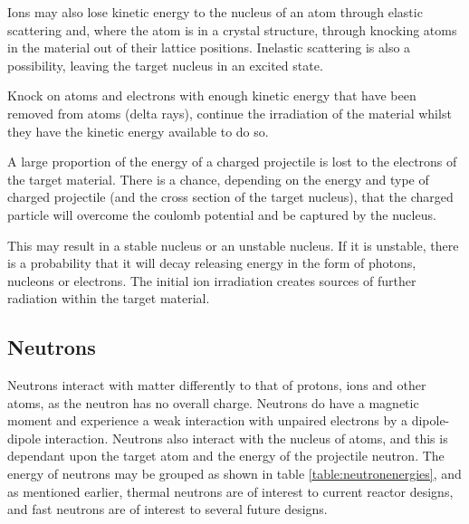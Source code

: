 Ions may also lose kinetic energy to the nucleus of an atom through elastic scattering and, where the atom is in a crystal structure, through knocking atoms in the material out of their lattice positions.  Inelastic scattering is also a possibility, leaving the target nucleus in an excited state.

Knock on atoms and electrons with enough kinetic energy that have been removed from atoms (delta rays), continue the irradiation of the material whilst they have the kinetic energy available to do so.

A large proportion of the energy of a charged projectile is lost to the electrons of the target material.  There is a chance, depending on the energy and type of charged projectile (and the cross section of the target nucleus), that the charged particle will overcome the coulomb potential and be captured by the nucleus.

This may result in a stable nucleus or an unstable nucleus.  If it is unstable, there is a probability that it will decay releasing energy in the form of photons, nucleons or electrons.  The initial ion irradiation creates sources of further radiation within the target material.



\FloatBarrier
\subsection{Neutrons}


Neutrons interact with matter differently to that of protons, ions and other atoms, as the neutron has no overall charge.  Neutrons do have a magnetic moment and experience a weak interaction with unpaired electrons by a dipole-dipole interaction.  Neutrons also interact with the nucleus of atoms, and this is dependant upon the target atom and the energy of the projectile neutron.  The energy of neutrons may be grouped as shown in table \ref{table:neutronenergies}, and as mentioned earlier, thermal neutrons are of interest to current reactor designs, and fast neutrons are of interest to several future designs.
 
